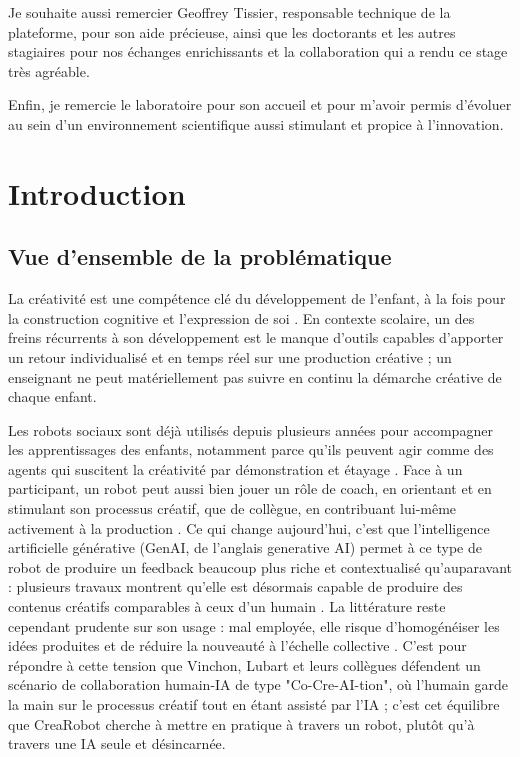 \documentclass[11pt]{article}
\begin{document}
Je souhaite aussi remercier Geoffrey Tissier, responsable technique de la plateforme, pour son aide précieuse, ainsi que les doctorants et les autres stagiaires pour nos échanges enrichissants et la collaboration qui a rendu ce stage très agréable.

Enfin, je remercie le laboratoire pour son accueil et pour m'avoir permis d'évoluer au sein d'un environnement scientifique aussi stimulant et propice à l'innovation.
\newpage

\tableofcontents
\newpage
{}

\listoffigures
\newpage
\listoftables
\newpage

\section{Introduction}

\subsection{Vue d'ensemble de la problématique}

La créativité est une compétence clé du développement de l'enfant, à la fois pour la construction cognitive et l'expression de soi \cite{fasko2001}. En contexte scolaire, un des freins récurrents à son développement est le manque d'outils capables d'apporter un retour individualisé et en temps réel sur une production créative \cite{cremin2021} ; un enseignant ne peut matériellement pas suivre en continu la démarche créative de chaque enfant.

Les robots sociaux sont déjà utilisés depuis plusieurs années pour accompagner les apprentissages des enfants, notamment parce qu'ils peuvent agir comme des agents qui suscitent la créativité par démonstration et étayage \cite{ali2021}. Face à un participant, un robot peut aussi bien jouer un rôle de coach, en orientant et en stimulant son processus créatif, que de collègue, en contribuant lui-même activement à la production \cite{lubart2005}. Ce qui change aujourd'hui, c'est que l'intelligence artificielle générative (GenAI, de l'anglais generative AI) permet à ce type de robot de produire un feedback beaucoup plus riche et contextualisé qu'auparavant : plusieurs travaux montrent qu'elle est désormais capable de produire des contenus créatifs comparables à ceux d'un humain \cite{haase2023}. La littérature reste cependant prudente sur son usage : mal employée, elle risque d'homogénéiser les idées produites et de réduire la nouveauté à l'échelle collective \cite{doshi2024}. C'est pour répondre à cette tension que Vinchon, Lubart et leurs collègues défendent un scénario de collaboration humain-IA de type "Co-Cre-AI-tion", où l'humain garde la main sur le processus créatif tout en étant assisté par l'IA \cite{vinchon2023} ; c'est cet équilibre que CreaRobot cherche à mettre en pratique à travers un robot, plutôt qu'à travers une IA seule et désincarnée.
\end{document}
